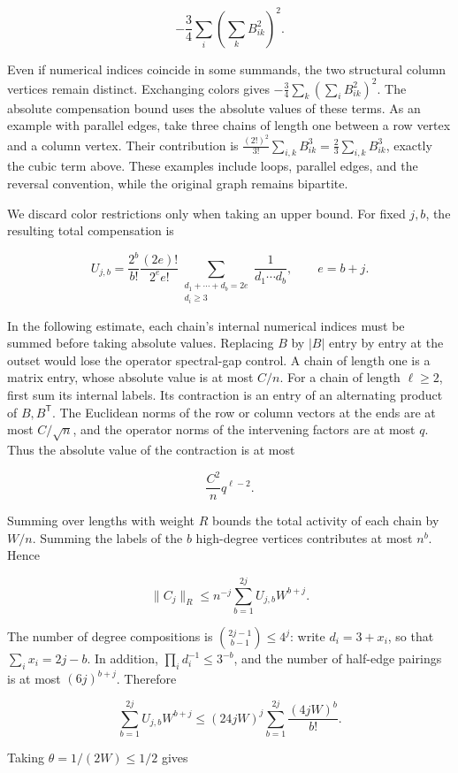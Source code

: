 \documentclass[11pt,a4paper]{article}
\begin{document}
\[
-\frac34\sum_i\left(\sum_k B_{ik}^2\right)^2.
\]

Even if numerical indices coincide in some summands, the two structural column vertices remain distinct. Exchanging colors gives \(-\tfrac34\sum_k(\sum_i B_{ik}^2)^2\). The absolute compensation bound uses the absolute values of these terms. As an example with parallel edges, take three chains of length one between a row vertex and a column vertex. Their contribution is \(\tfrac{(2!)^2}{3!}\sum_{i,k}B_{ik}^3=\tfrac23\sum_{i,k}B_{ik}^3\), exactly the cubic term above. These examples include loops, parallel edges, and the reversal convention, while the original graph remains bipartite.

We discard color restrictions only when taking an upper bound. For fixed \(j,b\), the resulting total compensation is

\[
U_{j,b}=
\frac{2^b}{b!}\frac{(2e)!}{2^e e!}
\sum_{\substack{d_1+\cdots+d_b=2e\\d_i\ge3}}
\frac1{d_1\cdots d_b},
\qquad e=b+j.
\]

In the following estimate, each chain's internal numerical indices must be summed before taking absolute values. Replacing \(B\) by \(|B|\) entry by entry at the outset would lose the operator spectral-gap control. A chain of length one is a matrix entry, whose absolute value is at most \(C/n\). For a chain of length \(\ell\ge2\), first sum its internal labels. Its contraction is an entry of an alternating product of \(B,B^{\mathsf T}\). The Euclidean norms of the row or column vectors at the ends are at most \(C/\sqrt n\), and the operator norms of the intervening factors are at most \(q\). Thus the absolute value of the contraction is at most

\[
\frac{C^2}{n}q^{\ell-2}.
\]

Summing over lengths with weight \(R\) bounds the total activity of each chain by \(W/n\). Summing the labels of the \(b\) high-degree vertices contributes at most \(n^b\). Hence

\[
\|C_j\|_R\le n^{-j}
\sum_{b=1}^{2j}U_{j,b}W^{b+j}.
\]

The number of degree compositions is \(\binom{2j-1}{b-1}\le4^j\): write \(d_i=3+x_i\), so that \(\sum_i x_i=2j-b\). In addition, \(\prod_i d_i^{-1}\le3^{-b}\), and the number of half-edge pairings is at most \((6j)^{b+j}\). Therefore

\[
\sum_{b=1}^{2j}U_{j,b}W^{b+j}
\le(24jW)^j
\sum_{b=1}^{2j}\frac{(4jW)^b}{b!}.
\]

Taking \(\theta=1/(2W)\le1/2\) gives
\end{document}
